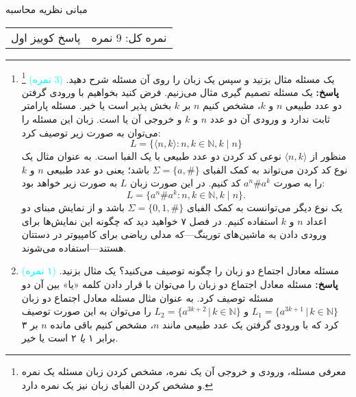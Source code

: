 \documentclass{article}
\begin{document}
	\begin{center}
		\Huge
		مبانی نظریه محاسبه
	\end{center}
	\Large
	\begin{tabularx}{\linewidth}{>{\raggedleft\arraybackslash}X>{\raggedright\arraybackslash}X}
		پاسخ کوییز اول
		&
		نمره کل: 9 نمره
	\end{tabularx}
	\rule{\textwidth}{1pt}
	\begin{enumerate}
		\item 
		یک مسئله مثال بزنید و سپس یک زبان را روی آن مسئله شرح دهید.
		\textcolor{cyan}{
		(3 نمره)
		}
	\footnote{
معرفی مسئله، ورودی و خروجی آن یک نمره، مشخص کردن زبان مسئله یک نمره و مشخص کردن الفبای زبان نیز یک نمره دارد.	
}
		\\
		\textbf{پاسخ:}
		یک مسئله تصمیم گیری 
		مثال می‌زنیم. فرض کنید بخواهیم با ورودی گرفتن دو عدد طبیعی $n$ و $k$، مشخص کنیم $n$ بر $k$ بخش پذیر است یا خیر. مسئله پارامتر ثابت ندارد و ورودی آن دو عدد $n$ و $k$ و خروجی آن 
		یا
		است. زبان این مسئله را می‌توان به صورت زیر توصیف کرد:
		$$L = \{\langle n,k\rangle  :  n,k \in \mathbb{N}, k \mid n\}$$
		منظور از 
		$\langle n,k\rangle$
		نوعی کد کردن 
		دو عدد طبیعی با یک الفبا است. به عنوان مثال یک نوع کد کردن می‌تواند به کمک الفبای 
		$\Sigma = \{a, \#\}$
		باشد؛ یعنی دو عدد طبیعی $n$ و $k$ را به صورت
		$a^n\#a^k$
		کد کنیم. در این صورت زبان $L$ به صورت زیر خواهد بود:
		$$L = \{a^n\#a^k  :  n,k \in \mathbb{N}, k \mid n\}.$$
		یک نوع دیگر می‌توانست به کمک الفبای
			$\Sigma = \{0, 1, \#\}$
			باشد و از نمایش مبنای دو اعداد $n$ و $k$ استفاده کنیم. در فصل ۷ خواهید دید که چگونه این نمایش‌ها برای ورودی دادن به ماشین‌های تورینگ---که مدلی ریاضی برای کامپیوتر در دستتان هستند---استفاده می‌شوند.
		\item 
		مسئله معادل اجتماع دو زبان را چگونه توصیف می‌کنید؟ یک مثال بزنید.
				\textcolor{cyan}{
			(۱ نمره)
		}
				\\
		\textbf{پاسخ:}
		مسئله معادل اجتماع دو زبان را می‌توان با قرار دادن کلمه «یا» بین آن دو مسئله توصیف کرد. به عنوان مثال مسئله معادل اجتماع دو زبان
		$L_1 = \{a^{3k+1} \, | \, k \in \mathbb{N} \}$
		و
				$L_2 = \{a^{3k+2} \, | \, k \in \mathbb{N} \}$
				را می‌توان به این صورت توصیف کرد که با ورودی گرفتن یک عدد طبیعی مانند $n$، مشخص کنیم باقی مانده $n$ بر ۳ برابر ۱ 
				\textit{یا}
				۲ است یا خیر.
		

\end{enumerate}
\end{document}
